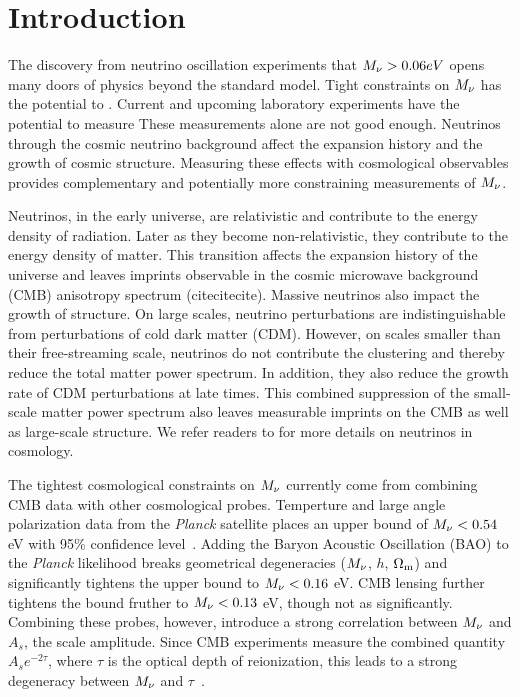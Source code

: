 \section{Introduction}
The discovery from neutrino oscillation experiments that $M_\nu > 0.06eV$
opens many doors of physics beyond the standard model. Tight constraints on $M_\nu$ 
has the potential to . 
Current and upcoming laboratory experiments have the potential to measure 
These measurements alone are not good enough. 
Neutrinos through the cosmic neutrino background affect the expansion history 
and the growth of cosmic structure. Measuring these effects with cosmological 
observables provides complementary and potentially more constraining 
measurements of $M_\nu$. 

Neutrinos, in the early universe, are relativistic and contribute to the 
energy density of radiation. Later as they become non-relativistic, 
they contribute to the energy density of matter. This transition affects 
the expansion history of the universe and leaves imprints observable in 
the cosmic microwave background (CMB) anisotropy spectrum (citecitecite). 
Massive neutrinos also impact the growth of structure. On large scales, 
neutrino perturbations are indistinguishable from perturbations of cold 
dark matter (CDM). However, on scales smaller than their free-streaming 
scale, neutrinos do not contribute the clustering and thereby reduce the
total matter power spectrum. In addition, they also reduce the growth 
rate of CDM perturbations at late times. This combined suppression of 
the small-scale matter power spectrum also leaves measurable imprints 
on the CMB as well as large-scale structure. We refer readers to
\cite{lesgourgues2012,lesgourgues2014,gerbino2018} for more details 
on neutrinos in cosmology. 

The tightest cosmological constraints on $M_\nu$ currently come from 
combining CMB data with other cosmological probes. Temperture and large 
angle polarization data from the {\em Planck} satellite places an upper 
bound of $M_\nu < 0.54$ eV with 95\% confidence level~\citep{planckcollaboration2018}. 
Adding the Baryon Acoustic Oscillation (BAO) to the {\em Planck} 
likelihood breaks geometrical degeneracies ($M_\nu$, $h$, $\Omega_{\rm m}$) 
and significantly tightens the upper bound to $M_\nu < 0.16$ eV. CMB 
lensing further tightens the bound fruther to $M_\nu < 0.13$ eV, though 
not as significantly. Combining these probes, however, introduce a strong 
correlation between $M_\nu$ and $A_s$, the scale amplitude. Since CMB 
experiments measure the combined quantity $A_s e^{-2\tau}$, where 
$\tau$ is the optical depth of reionization, this leads to a strong 
degeneracy between $M_\nu$ and $\tau$~\citep{allison2015, liu2016, archidiacono2017}. 

